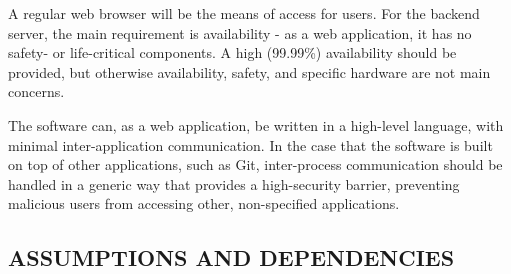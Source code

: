 \documentclass[letterpaper, 10pt, draftclsnofoot, compsoc, onecolumn]{IEEEtran}
\begin{document}
{\noindent 
A regular web browser will be the means of access for users. For the backend
server, the main requirement is availability - as a web application, it has no
safety- or life-critical components. A high (99.99\%) availability should be provided,
but otherwise availability, safety, and specific hardware are not main concerns.}

\bigskip

{\noindent 
The software can, as a web application, be written in a high-level language, with
minimal inter-application communication. In the case that the software is built
on top of other applications, such as Git, inter-process communication should be
handled in a generic way that provides a high-security barrier, preventing malicious
users from accessing other, non-specified applications.}

\subsection[ASSUMPTIONS AND DEPENDENCIES]{\rmfamily\bfseries\color{black} ASSUMPTIONS AND DEPENDENCIES}
\end{document}
